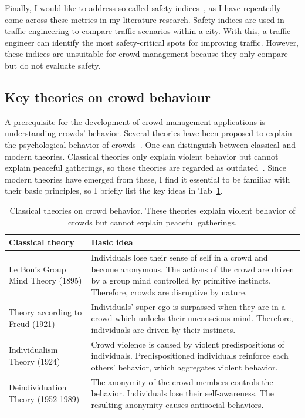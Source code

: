 Finally, I would like to address so-called safety indices~\cite{carter-2007-cdyn,zegeer-2006-cdyn,montella-2020-cdyn,krishnan-2023-cdyn}, as I have repeatedly come across these metrics in my literature research.
Safety indices are used in traffic engineering to compare traffic scenarios within a city. With this, a traffic engineer can identify the most safety-critical spots for improving traffic. However, these indices are unsuitable for crowd management because they only compare but do not evaluate safety. 



\subsection{Key theories on crowd behaviour}
\label{sec:crowdbah}


A prerequisite for the development of crowd management applications is understanding crowds' behavior. 
Several theories have been proposed to explain the psychological behavior of crowds~\cite{lebon-1895-life,freud-1921-life,allport-1924-life,zimbardo-1999-life,sherif-1936-life,turner-1957-life,berk-1974-life,berk-1974a-life}. One can distinguish between classical and modern theories. Classical theories only explain violent behavior but cannot explain peaceful gatherings, so these theories are regarded as outdated~\cite{challenger-2009-cdyn}. Since modern theories have emerged from these, I find it essential to be familiar with their basic principles, so I briefly list the key ideas in Tab~\ref{tab:classicaltheories}.



\begin{table}[hbt!]
\begin{tabular}{p{4cm}p{10cm}}
 \hline
Classical theory & Basic idea \\ \hline
Le Bon's Group Mind Theory (1895)  \cite{lebon-1895-life} & Individuals lose their sense of self in a crowd and become anonymous. The actions of the crowd are driven by a group mind controlled by primitive instincts. Therefore, crowds are disruptive by nature.  \\ 
Theory according to Freud (1921)  \cite{freud-1921-life} & Individuals' super-ego is surpassed when they are in a crowd which unlocks their unconscious mind. Therefore, individuals are driven by their instincts.  \\
 Individualism Theory (1924)  \cite{allport-1924-life} & Crowd violence is caused by violent predispositions of individuals. Predispositioned individuals reinforce each others' behavior, which aggregates violent behavior. \\
 Deindividuation Theory (1952-1989)  \cite{zimbardo-1999-life} & The anonymity of the crowd members controls the behavior. Individuals lose their self-awareness. The resulting anonymity causes antisocial behaviors.\\
 \hline
\end{tabular}
\caption{Classical theories on crowd behavior. These theories explain violent behavior of crowds but cannot explain peaceful gatherings.   }
\label{tab:classicaltheories}
\end{table}

